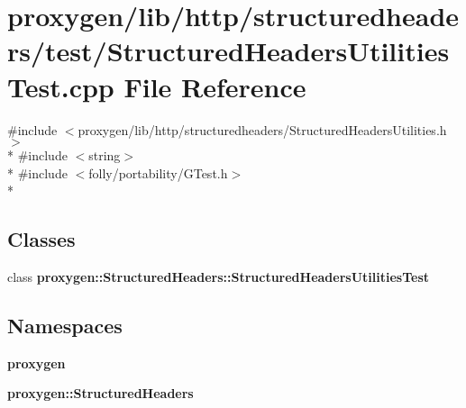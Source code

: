 \section{proxygen/lib/http/structuredheaders/test/\+Structured\+Headers\+Utilities\+Test.cpp File Reference}
\label{StructuredHeadersUtilitiesTest_8cpp}
{\ttfamily \#include $<$proxygen/lib/http/structuredheaders/\+Structured\+Headers\+Utilities.\+h$>$}\\*
{\ttfamily \#include $<$string$>$}\\*
{\ttfamily \#include $<$folly/portability/\+G\+Test.\+h$>$}\\*
\subsection*{Classes}
\begin{DoxyCompactItemize}
\item 
class {\bf proxygen\+::\+Structured\+Headers\+::\+Structured\+Headers\+Utilities\+Test}
\end{DoxyCompactItemize}
\subsection*{Namespaces}
\begin{DoxyCompactItemize}
\item 
 {\bf proxygen}
\item 
 {\bf proxygen\+::\+Structured\+Headers}
\end{DoxyCompactItemize}
